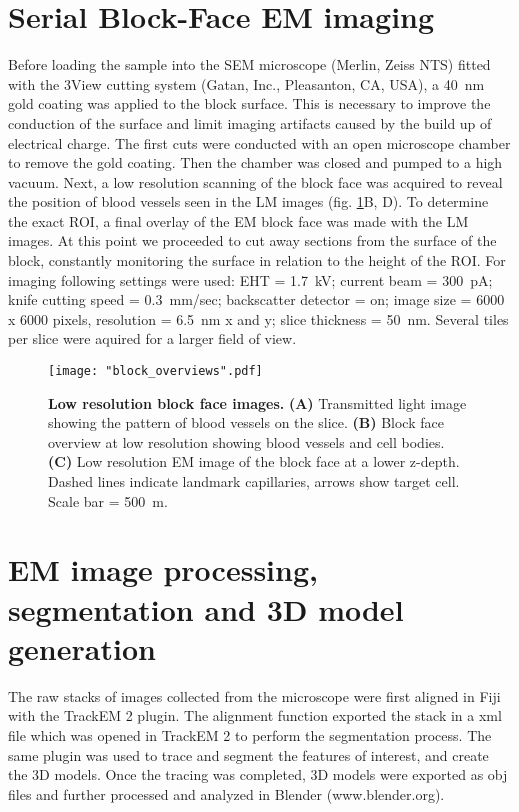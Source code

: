 \section{Serial Block-Face EM imaging}
\label{sec:3View}
Before loading the sample into the SEM microscope (Merlin, Zeiss NTS) fitted with the 3View cutting system (Gatan, Inc., Pleasanton, CA, USA), a 40~nm gold coating was applied to the block surface. This is necessary to improve the conduction of the surface and limit imaging artifacts caused by the build up of electrical charge. The first cuts were conducted with an open microscope chamber to remove the gold coating. Then the chamber was closed and pumped to a high vacuum. Next, a low resolution scanning of the block face was acquired to reveal the position of blood vessels seen in the LM images (fig. \ref{fig:block_overviews}B, D). To determine the exact ROI, a final overlay of the EM block face was made with the LM images. At this point we proceeded to cut away sections from the surface of the block, constantly monitoring the surface in relation to the height of the ROI. For imaging following settings were used: EHT = 1.7~kV; current beam = 300~pA; knife cutting speed = 0.3~mm/sec; backscatter detector = on; image size = 6000 x 6000 pixels, resolution = 6.5~nm x and y; slice thickness = 50~nm. Several tiles per slice were aquired for a larger field of view.
\begin{figure}[!h]
	\captionsetup[figure]{indentation=0pt}
	\texttt{[image: "block\_overviews".pdf]}
	\caption{\textbf{Low resolution block face images.} \textbf{(A)} Transmitted light image showing the pattern of blood vessels on the slice. \textbf{(B)} Block face overview at low resolution showing blood vessels and cell bodies. \textbf{(C)} Low resolution EM image of the block face at a lower z-depth. Dashed lines indicate landmark capillaries, arrows show target cell. Scale bar = 500~\textmu m.}
	\label{fig:block_overviews}
\end{figure}
\section{EM image processing, segmentation and 3D model generation}
\label{sec:fiji}
The raw stacks of images collected from the microscope were first aligned in Fiji with the TrackEM 2 plugin. The alignment function exported the stack in a xml file which was opened in TrackEM 2 to perform the segmentation process. The same plugin was used to trace and segment the features of interest, and create the 3D models. Once the tracing was completed, 3D models were exported as obj files and further processed and analyzed in Blender (www.blender.org). 
